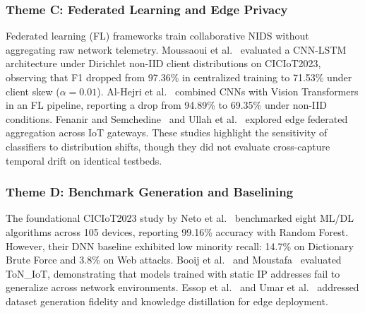 \documentclass[conference,10pt,twocolumn]{IEEEtran}
\begin{document}
\subsubsection{Theme C: Federated Learning and Edge Privacy}
Federated learning (FL) frameworks train collaborative NIDS without aggregating raw network telemetry. Moussaoui et al.~\cite{moussaoui2026resilient} evaluated a CNN-LSTM architecture under Dirichlet non-IID client distributions on CICIoT2023, observing that F1 dropped from 97.36\% in centralized training to 71.53\% under client skew ($\alpha=0.01$). Al-Hejri et al.~\cite{alhejri2026improving} combined CNNs with Vision Transformers in an FL pipeline, reporting a drop from 94.89\% to 69.35\% under non-IID conditions. Fenanir and Semchedine~\cite{fenanir2023smart} and Ullah et al.~\cite{ullah2026comparative} explored edge federated aggregation across IoT gateways. These studies highlight the sensitivity of classifiers to distribution shifts, though they did not evaluate cross-capture temporal drift on identical testbeds.

\subsubsection{Theme D: Benchmark Generation and Baselining}
The foundational CICIoT2023 study by Neto et al.~\cite{neto2023ciciot} benchmarked eight ML/DL algorithms across 105 devices, reporting 99.16\% accuracy with Random Forest. However, their DNN baseline exhibited low minority recall: 14.7\% on Dictionary Brute Force and 3.8\% on Web attacks. Booij et al.~\cite{booij2022toniot} and Moustafa~\cite{moustafa2021distributed} evaluated ToN\_IoT, demonstrating that models trained with static IP addresses fail to generalize across network environments. Essop et al.~\cite{essop2021dataset} and Umar et al.~\cite{umar2025energy} addressed dataset generation fidelity and knowledge distillation for edge deployment.
\end{document}
